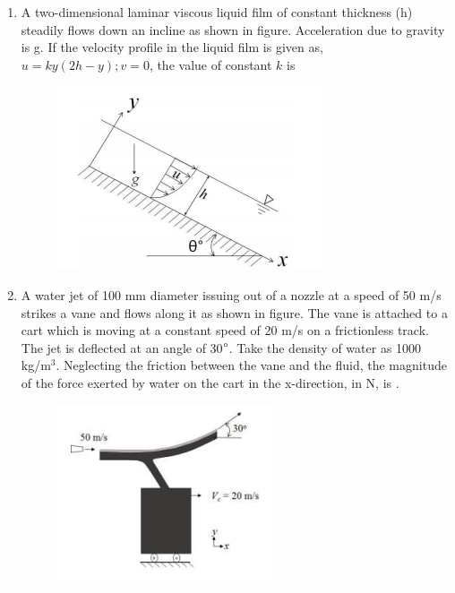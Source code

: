 \documentclass[a4paper,10pt]{article}
\begin{document}
\begin{enumerate}
    \item A two-dimensional laminar viscous liquid film of constant thickness (h) steadily flows down an incline as shown in figure. Acceleration due to gravity is g. If the velocity profile in the liquid film is given as, $u = ky(2h-y); v=0$, the value of constant $k$ is
    \begin{figure}[H] \centering \includegraphics[width=0.6\columnwidth]{q13_fluid_2018.png} \caption*{} \label{fig:q13_fluid_2018} \end{figure}
    \hfill{}
    \begin{enumerate}[label=\Alph*)]
    \end{enumerate}

    \item A water jet of 100 mm diameter issuing out of a nozzle at a speed of 50 m/s strikes a vane and flows along it as shown in figure. The vane is attached to a cart which is moving at a constant speed of 20 m/s on a frictionless track. The jet is deflected at an angle of 30$\degree$. Take the density of water as 1000 kg/m$^3$. Neglecting the friction between the vane and the fluid, the magnitude of the force exerted by water on the cart in the x-direction, in N, is \underline{\hspace{2cm}}.
    \begin{figure}[H] \centering \includegraphics[width=0.5\columnwidth]{q14_fluid_2018.png} \caption*{} \label{fig:q14_fluid_2018} \end{figure}
    \hfill{}


\end{enumerate}
\end{document}
